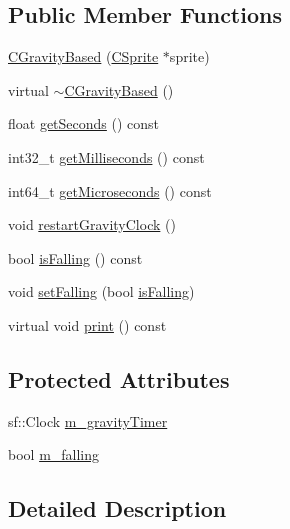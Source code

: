 \subsection*{Public Member Functions}
\begin{DoxyCompactItemize}
\item 
\hyperlink{classengine_1_1CGravityBased_a30378d0b24aa6313d12dc80d73492ca8}{C\-Gravity\-Based} (\hyperlink{classCSprite}{C\-Sprite} $\ast$sprite)
\item 
virtual \hyperlink{classengine_1_1CGravityBased_ad29312b47a2cb90d704b0557287c463c}{$\sim$\-C\-Gravity\-Based} ()
\item 
float \hyperlink{classengine_1_1CGravityBased_a723ff2142db951f2de1936b895e4037b}{get\-Seconds} () const 
\item 
int32\-\_\-t \hyperlink{classengine_1_1CGravityBased_a3b08ec9890633769718987a88a80ef83}{get\-Milliseconds} () const 
\item 
int64\-\_\-t \hyperlink{classengine_1_1CGravityBased_ae8168fa3497abc6a1a6fd06124b751e5}{get\-Microseconds} () const 
\item 
void \hyperlink{classengine_1_1CGravityBased_a43969612f1a106a54fd225e88bb6dd73}{restart\-Gravity\-Clock} ()
\item 
bool \hyperlink{classengine_1_1CGravityBased_aafff7dd45619ea9a948b266e364de4d8}{is\-Falling} () const 
\item 
void \hyperlink{classengine_1_1CGravityBased_aaaa791268b4c455f6137a3319473bf3c}{set\-Falling} (bool \hyperlink{classengine_1_1CGravityBased_aafff7dd45619ea9a948b266e364de4d8}{is\-Falling})
\item 
virtual void \hyperlink{classengine_1_1CGravityBased_a1fd898d6529eeb9bb8651d7d9bcdb89c}{print} () const 
\end{DoxyCompactItemize}
\subsection*{Protected Attributes}
\begin{DoxyCompactItemize}
\item 
sf\-::\-Clock \hyperlink{classengine_1_1CGravityBased_a124ef300a1b855b6b508bdfede4fca39}{m\-\_\-gravity\-Timer}
\item 
bool \hyperlink{classengine_1_1CGravityBased_a25ea6b058b1c266b9307434bd0446828}{m\-\_\-falling}
\end{DoxyCompactItemize}


\subsection{Detailed Description}


